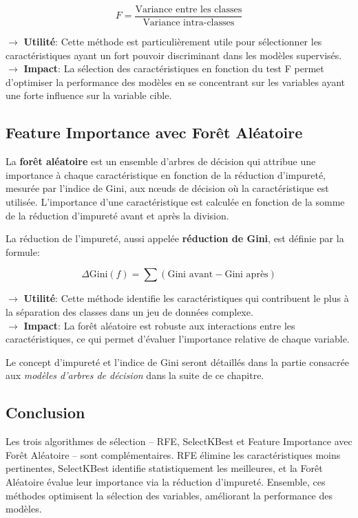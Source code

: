 \[
F = \frac{\text{Variance entre les classes}}{\text{Variance intra-classes}}
\]

\noindent \textbf{\(\rightarrow\)} \textbf{Utilité}: Cette méthode est particulièrement utile pour sélectionner les caractéristiques ayant un fort pouvoir discriminant dans les modèles supervisés.\\
\textbf{\(\rightarrow\)} \textbf{Impact}: La sélection des caractéristiques en fonction du test F permet d'optimiser la performance des modèles en se concentrant sur les variables ayant une forte influence sur la variable cible.

\subsection{Feature Importance avec Forêt Aléatoire}

La \textbf{forêt aléatoire} est un ensemble d'arbres de décision qui attribue une importance à chaque caractéristique en fonction de la réduction d'impureté, mesurée par l'indice de Gini, aux nœuds de décision où la caractéristique est utilisée. L'importance d'une caractéristique est calculée en fonction de la somme de la réduction d'impureté avant et après la division.

La réduction de l'impureté, aussi appelée \textbf{réduction de Gini}, est définie par la formule:

\[
\Delta \text{Gini}(f) = \sum (\text{Gini avant} - \text{Gini après})
\]

\noindent \textbf{\(\rightarrow\)} \textbf{Utilité}: Cette méthode identifie les caractéristiques qui contribuent le plus à la séparation des classes dans un jeu de données complexe.\\
\textbf{\(\rightarrow\)} \textbf{Impact}: La forêt aléatoire est robuste aux interactions entre les caractéristiques, ce qui permet d'évaluer l'importance relative de chaque variable.

Le concept d'impureté et l'indice de Gini seront détaillés dans la partie consacrée aux \textit{modèles d'arbres de décision} dans la suite de ce chapitre.

\subsection{Conclusion}

Les trois algorithmes de sélection – RFE, SelectKBest et Feature Importance avec Forêt Aléatoire – sont complémentaires. RFE élimine les caractéristiques moins pertinentes, SelectKBest identifie statistiquement les meilleures, et la Forêt Aléatoire évalue leur importance via la réduction d'impureté. Ensemble, ces méthodes optimisent la sélection des variables, améliorant la performance des modèles.


